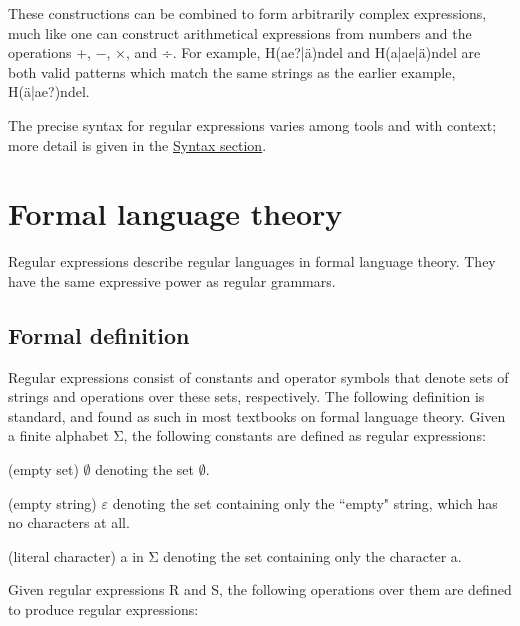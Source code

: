 These constructions can be combined to form arbitrarily complex expressions, much like one can construct arithmetical expressions from numbers and the operations +, −, ×, and ÷. For example, \textsf{H(ae?|ä)ndel} and \textsf{H(a|ae|ä)ndel} are both valid patterns which match the same strings as the earlier example, \textsf{H(ä|ae?)ndel}.

The precise syntax for regular expressions varies among tools and with context; more detail is given in the \hyperref[regular_expression_syntax]{Syntax section}.




\chapter{Formal language theory}

Regular expressions describe regular languages in formal language theory. They have the same expressive power as regular grammars.






\section{Formal definition}

Regular expressions consist of constants and operator symbols that denote sets of strings and operations over these sets, respectively. The following definition is standard, and found as such in most textbooks on formal language theory. Given a finite alphabet Σ, the following constants are defined as regular expressions:


\begin{compactitem}
\item (\textsf{empty set}) $\emptyset$ denoting the set $\emptyset$.
\item (\textsf{empty string}) $\varepsilon$ denoting the set containing only the ``empty" string, which has no characters at all.
\item (\textsf{literal character}) a in Σ denoting the set containing only the character a.
\end{compactitem}


Given regular expressions R and S, the following operations over them are defined to produce regular expressions:

